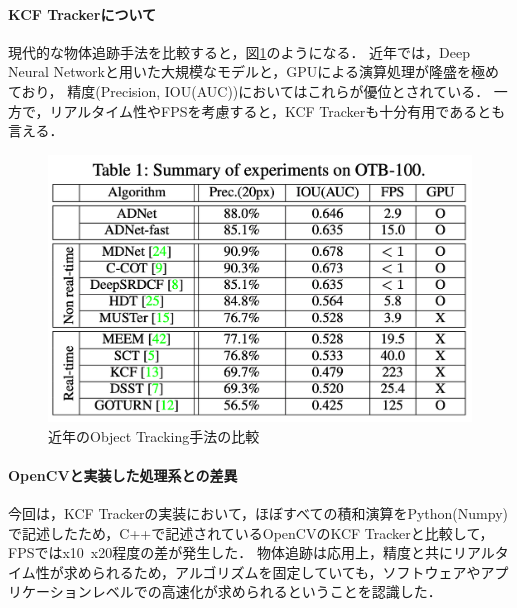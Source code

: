 \documentclass[11pt,a4j]{jarticle}
\begin{document}
  \paragraph{KCF Trackerについて}
  現代的な物体追跡手法を比較すると，図\ref{fig:tracker_comparison}のようになる．\cite{yun2017adnet}
  近年では，Deep Neural Networkと用いた大規模なモデルと，GPUによる演算処理が隆盛を極めており，
  精度(Precision, IOU(AUC))においてはこれらが優位とされている．
  一方で，リアルタイム性やFPSを考慮すると，KCF Trackerも十分有用であるとも言える．

  \begin{figure}[htbp]
    \begin{center}
      \includegraphics[clip,width=12.5cm]{./figures/yun2017adnet.png}
      \caption{近年のObject Tracking手法の比較\cite{yun2017adnet}}
      \label{fig:tracker_comparison}
    \end{center}
  \end{figure}

  \paragraph{OpenCVと実装した処理系との差異}
  今回は，KCF Trackerの実装において，ほぼすべての積和演算をPython(Numpy)で記述したため，C++で記述されているOpenCVのKCF Trackerと比較して，FPSではx10~x20程度の差が発生した．
  物体追跡は応用上，精度と共にリアルタイム性が求められるため，アルゴリズムを固定していても，ソフトウェアやアプリケーションレベルでの高速化が求められるということを認識した．

  \newpage

\end{document}
